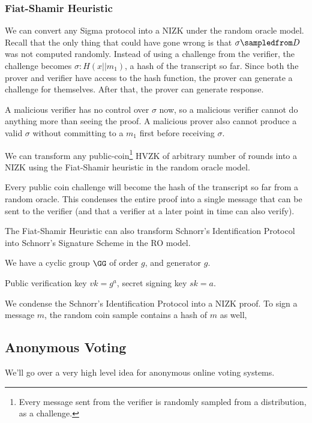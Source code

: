\subsubsection{Fiat-Shamir Heuristic}\label{sec:mar7-fiat-shamir}
We can convert any Sigma protocol into a NIZK under the random oracle model. Recall that the only thing that could have gone wrong is that $\sigma\sampledfrom D$ was not computed randomly. Instead of using a challenge from the verifier, the challenge becomes $\sigma: H(x||m_1)$, a hash of the transcript so far. Since both the prover and verifier have access to the hash function, the prover can generate a challenge for themselves. After that, the prover can generate response.

A malicious verifier has no control over $\sigma$ now, so a malicious verifier cannot do anything more than seeing the proof. A malicious prover also cannot produce a valid $\sigma$ without committing to a $m_1$ first before receiving $\sigma$.

We can transform any public-coin\footnote{Every message sent from the verifier is randomly sampled from a distribution, as a challenge.} HVZK of arbitrary number of rounds into a NIZK using the Fiat-Shamir heuristic in the random oracle model.

Every public coin challenge will become the hash of the transcript so far from a random oracle. This condenses the entire proof into a single message that can be sent to the verifier (and that a verifier at a later point in time can also verify).

\begin{example}
    The Fiat-Shamir Heuristic can also transform Schnorr's Identification Protocol into Schnorr's Signature Scheme in the RO model.

    We have a cyclic group $\GG$ of order $g$, and generator $g$.

    Public verification key $vk = g^a$, secret signing key $sk = a$.

    We condense the Schnorr's Identification Protocol into a NIZK proof. To sign a message $m$, the random coin sample contains a hash of $m$ as well, 
\end{example}

\subsection{Anonymous Voting}
We'll go over a very high level idea for anonymous online voting systems.

